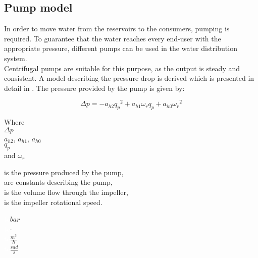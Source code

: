 \subsection{Pump model} 
\label{PumpModel}
In order to move water from the reservoirs to the consumers, pumping is required. To guarantee that the water reaches every end-user with the appropriate pressure, different pumps can be used in the water distribution system.\\
Centrifugal pumps are suitable for this purpose, as the output is steady and consistent. 
A model describing the pressure drop is derived which is presented in detail in \cite{Phd_Carsten}. The pressure provided by the pump is given by:

\begin{equation}
  \Delta p = -a_{h2}{q_p}^2 + a_{h1} \omega_r q_p + a_{h0}{\omega_r}^2
  \label{eq:PumpModel}
\end{equation}

\begin{minipage}[t]{0.20\textwidth}
Where\\
\hspace*{8mm} $\Delta p$ \\
\hspace*{8mm} $a_{h2}$, $a_{h1}$, $a_{h0}$ \\
\hspace*{8mm} $q_p$ \\
and \hspace*{0.7mm} $\omega_r$ 

\end{minipage}
\begin{minipage}[t]{0.68\textwidth}
\vspace*{2mm}
is the pressure produced by the pump,\\
are constants describing the pump,\\
is the volume flow through the impeller,\\
is the impeller rotational speed.
\end{minipage}
\begin{minipage}[t]{0.10\textwidth}
\vspace*{2mm}
\textcolor{White}{te}$\unit{bar}$\\
\textcolor{White}{te}$\unit{\cdot}$\\
\textcolor{White}{te}$\unit{\frac{m^3}{h}}$\\
\textcolor{White}{te}$\unit{\frac{rad}{s}}$
\end{minipage}	

